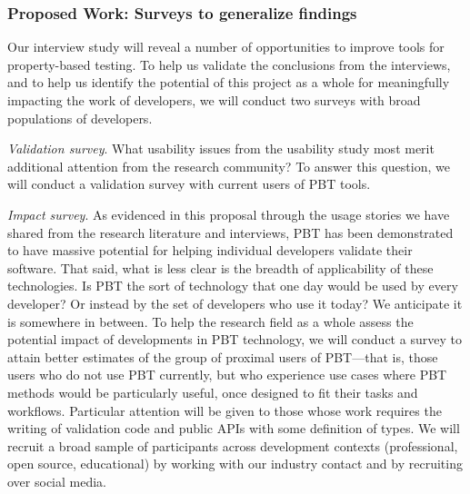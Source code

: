 \subsubsection{Proposed Work: Surveys to generalize findings}
\label{sec:survey}


Our interview study will reveal a number of opportunities to
improve tools for property-based testing. To help us
validate the conclusions from the interviews, and to help us
identify the potential of this project as a whole for
meaningfully impacting the work of developers, we will
conduct two surveys with broad populations of developers.

\emph{Validation survey}. What usability issues from the
usability study most merit additional attention from the
research community? To answer this question, we will conduct
a validation survey with current users of PBT tools.

\emph{Impact survey}. As evidenced in this proposal through
the usage stories we have shared from the research
literature and interviews, PBT has been demonstrated to have
massive potential for helping individual developers validate
their software. That said, what is less clear is the breadth
of applicability of these technologies. Is PBT the sort of
technology that one day would be used by every developer? Or
instead by the set of developers who use it today? We
anticipate it is somewhere in between. To help the research
field as a whole assess the potential impact of developments
in PBT technology, we will conduct a survey to attain better
estimates of the group of proximal users of PBT---that is,
those users who do not use PBT currently, but who experience
use cases where PBT methods would be particularly useful,
once designed to fit their tasks and workflows. Particular
attention will be given to those whose work requires the
writing of validation code and public APIs with some
definition of types. We will recruit a broad sample of
participants across development contexts (professional, open
source, educational) by working with our industry contact
and by recruiting over social media. 

